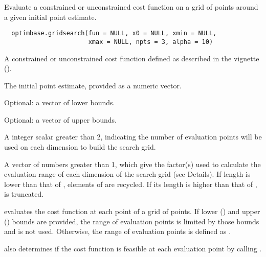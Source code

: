 %
\begin{Description}\relax
Evaluate a constrained or unconstrained cost function on a grid of points 
around a given initial point estimate.
\end{Description}
%
\begin{Usage}
\begin{verbatim}
  optimbase.gridsearch(fun = NULL, x0 = NULL, xmin = NULL, 
                       xmax = NULL, npts = 3, alpha = 10)
\end{verbatim}
\end{Usage}
%
\begin{Arguments}
\begin{ldescription}
\item[\code{fun}] A constrained or unconstrained cost function defined as described 
in the vignette ().
\item[\code{x0}] The initial point estimate, provided as a numeric vector.
\item[\code{xmin}] Optional: a vector of lower bounds.
\item[\code{xmax}] Optional: a vector of upper bounds.
\item[\code{npts}] A integer scalar greater than 2, indicating the number of 
evaluation points will be used on each dimension to build the search grid.
\item[\code{alpha}] A vector of numbers greater than 1, which give the factor(s) used 
to calculate the evaluation range of each dimension of the search grid (see 
Details). If  length is lower than that of , elements 
of  are recycled. If its length is higher than that of 
,  is truncated.
\end{ldescription}
\end{Arguments}
%
\begin{Details}\relax
{} evaluates the cost function at each point 
of a grid of  points. If lower () and upper 
() bounds are provided, the range of evaluation points is limited 
by those bounds and  is not used. Otherwise, the range of 
evaluation points is defined as .

 also determines if the cost function is
feasible at each evaluation point by calling .
\end{Details}
